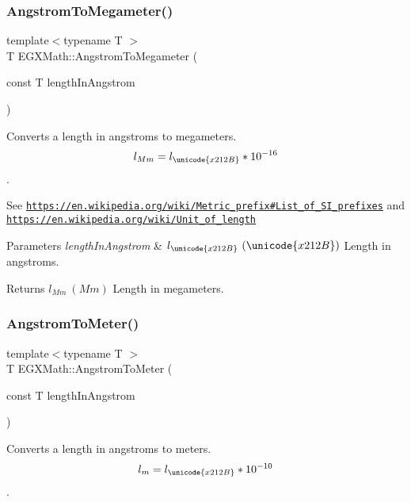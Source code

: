 \subsubsection{\texorpdfstring{Angstrom\+To\+Megameter()}{AngstromToMegameter()}}
{\footnotesize\ttfamily template$<$typename T $>$ \\
T E\+G\+X\+Math\+::\+Angstrom\+To\+Megameter (\begin{DoxyParamCaption}\item[{const T}]{length\+In\+Angstrom }\end{DoxyParamCaption})}



Converts a length in angstroms to megameters. \[ l_{Mm}=l_{\unicode{x212B}} * 10^{-16} \]. 

See \href{https://en.wikipedia.org/wiki/Metric_prefix#List_of_SI_prefixes}{\tt https\+://en.\+wikipedia.\+org/wiki/\+Metric\+\_\+prefix\#\+List\+\_\+of\+\_\+\+S\+I\+\_\+prefixes} and \href{https://en.wikipedia.org/wiki/Unit_of_length}{\tt https\+://en.\+wikipedia.\+org/wiki/\+Unit\+\_\+of\+\_\+length} 
\begin{DoxyParams}{Parameters}
{\em length\+In\+Angstrom} & $ l_{\unicode{x212B}}\ (\unicode{x212B})$ Length in angstroms. \\
\hline
\end{DoxyParams}
\begin{DoxyReturn}{Returns}
$ l_{Mm}\ (Mm)$ Length in megameters. 
\end{DoxyReturn}
\mbox{\label{group___e_g_x_math-_conversions-_length_conversions-_non-_s_i-_angstrom-_s_i_ga342cd009d104ec283921cd70841d500f}} 
\subsubsection{\texorpdfstring{Angstrom\+To\+Meter()}{AngstromToMeter()}}
{\footnotesize\ttfamily template$<$typename T $>$ \\
T E\+G\+X\+Math\+::\+Angstrom\+To\+Meter (\begin{DoxyParamCaption}\item[{const T}]{length\+In\+Angstrom }\end{DoxyParamCaption})}



Converts a length in angstroms to meters. \[ l_{m}=l_{\unicode{x212B}} * 10^{-10} \]. 


